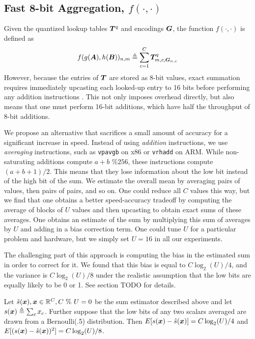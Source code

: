 \subsection{Fast 8-bit Aggregation, $f(\cdot,\cdot)$}

Given the quantized lookup tables $\bm{T}^{q}$ and encodings $\bm{G}$, the function $f(\cdot,\cdot)$ is defined as
\begin{align}
    f(g(\bm{A}), h(\bm{B}))_{n,m} \triangleq \sum_{c=1}^C \bm{T}^{q}_{m,c,\bm{G}_{n,c}} \\
\end{align}
However, because the entries of $\bm{T}$ are stored as 8-bit values, exact summation requires immediately upcasting each looked-up entry to 16 bits before performing any addition instructions \cite{bolt}. This not only imposes overhead directly, but also means that one must perform 16-bit additions, which have half the throughput of 8-bit additions.

We propose an alternative that sacrifices a small amount of accuracy for a significant increase in speed. Instead of using \textit{addition} instructions, we use \textit{averaging} instructions, such as \texttt{vpavgb} on x86 or \texttt{vrhadd} on ARM. While non-saturating additions compute $a + b \text{ \% } 256$, these instructions compute $(a + b + 1) / 2$. This means that they lose information about the low bit instead of the high bit of the sum. We estimate the overall mean by averaging pairs of values, then pairs of pairs, and so on. One could reduce all $C$ values this way, but we find that one obtains a better speed-accuracy tradeoff by computing the average of blocks of $U$ values and then upcasting to obtain exact sums of these averages. One obtains an estimate of the sum by multiplying this sum of averages by $U$ and adding in a bias correction term. One could tune $U$ for a particular problem and hardware, but we simply set $U = 16$ in all our experiments.

The challenging part of this approach is computing the bias in the estimated sum in order to correct for it. We found that this bias is equal to $C \log_2(U) / 4$, and the variance is $C \log_2(U) / 8$ under the realistic assumption that the low bits are equally likely to be 0 or 1. See section TODO for details.

\begin{theorem}
Let $\hat{s}(\bm{x}), \bm{x} \in \mathbb{R}^C, C \text{ \% } U = 0$ be the sum estimator described above and let $s(\bm{x}) \triangleq \sum_c x_c$. Further suppose that the low bits of any two scalars averaged are drawn from a Bernoulli(.5) distribution. Then $E[s(\bm{x}) - \hat{s}(\bm{x})] = C \log_2(U) / 4$ and $E[(s(\bm{x}) - \hat{s}(\bm{x}))^2] = C \log_2(U) / 8$.
\end{theorem}

